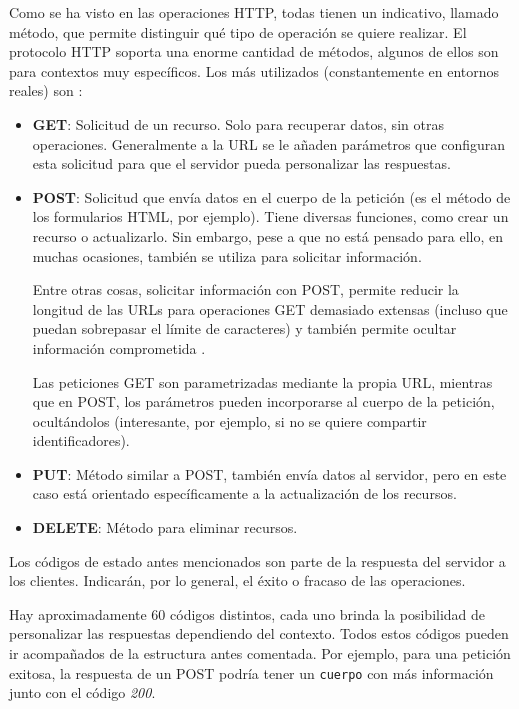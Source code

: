Como se ha visto en las operaciones HTTP, todas tienen un indicativo, llamado
método, que permite distinguir qué tipo de operación se quiere realizar. El
protocolo HTTP soporta una enorme cantidad de métodos, algunos de ellos son para
contextos muy específicos. Los más utilizados (constantemente en entornos
reales) son \cite{enwiki:1151700575}:
\begin{itemize}
	\item \textbf{GET}: Solicitud de un recurso. Solo para recuperar datos, sin
  otras operaciones. Generalmente a la URL se le añaden parámetros que
  configuran esta solicitud para que el servidor pueda personalizar las
  respuestas.
  \item \textbf{POST}: Solicitud que envía datos en el cuerpo de la petición (es
  el método de los formularios HTML, por ejemplo). Tiene diversas funciones,
  como crear un recurso o actualizarlo. Sin embargo, pese a que no está pensado
  para ello, en muchas ocasiones, también se utiliza para solicitar información.
  
  Entre otras cosas, solicitar información con POST, permite reducir la longitud
  de las URLs para operaciones GET demasiado extensas (incluso que puedan
  sobrepasar el límite de caracteres) y también permite ocultar información
  comprometida \cite{http:postnotget}. 
  
  Las peticiones GET son parametrizadas mediante la propia URL, mientras que en
  POST, los parámetros pueden incorporarse al cuerpo de la petición,
  ocultándolos (interesante, por ejemplo, si no se quiere compartir
  identificadores).
  \item \textbf{PUT}: Método similar a POST, también envía datos al servidor,
  pero en este caso está orientado específicamente a la actualización de los
  recursos.
  \item \textbf{DELETE}: Método para eliminar recursos.
\end{itemize}

Los códigos de estado antes mencionados son parte de la respuesta del servidor a
los clientes. Indicarán, por lo general, el éxito o fracaso de las operaciones.

Hay aproximadamente 60 códigos distintos, cada uno brinda la posibilidad de
personalizar las respuestas dependiendo del contexto. Todos estos códigos pueden
ir acompañados de la estructura antes comentada. Por ejemplo, para una petición
exitosa, la respuesta de un POST podría tener un \texttt{cuerpo} con más
información junto con el código \textit{200}. 

